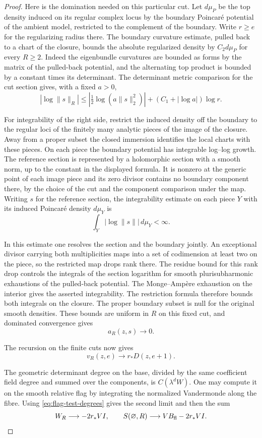 \begin{proof}
Here is the domination needed on this particular cut. Let
\(d\mu_P\) be the top density induced on its regular complex
locus by the boundary Poincar\'e potential of the ambient
model, restricted to the complement of the boundary. Write
\(r\ge e\) for the regularizing radius there. The
boundary curvature estimate, pulled back to a chart of the
closure, bounds the absolute regularized density by
\(C_2 d\mu_P\) for every \(R\ge2\). Indeed the eigenbundle
curvatures are bounded as forms by the matrix of the pulled-back
potential, and the alternating top product is bounded by a
constant times its determinant. The determinant metric comparison
for the cut section gives, with a fixed \(a>0\),
\[
 |\log\|s\|_R|
 \le |\tfrac12\log(a\|s\|_2^2)|
       +(C_1+|\log a|)\log r .
\]

For integrability of the right side, restrict the induced
density off the boundary to the regular loci of the finitely
many analytic pieces of the image of the closure. Away from
a proper subset the closed immersion identifies the local
charts with these pieces.
On each piece the boundary potential has integrable
log--log growth. The reference section is represented by a
holomorphic section with a smooth norm, up to the constant
in the displayed formula. It is nonzero at the generic point
of each image piece and its zero divisor contains no boundary
component there, by the choice of the cut and the
component comparison under the map. Writing \(s\) for the reference section, the integrability estimate on each piece \(Y\) with its induced Poincar\'e density \(d\mu_Y\) is
\[
 \int_Y\big|\log\|s\|\big|\,d\mu_Y<\infty.
\]

In this estimate one resolves the section
and the boundary jointly. An exceptional divisor carrying
both multiplicities maps into a set of codimension at least
two on the piece, so the restricted map drops rank there.
The residue bound for this rank drop controls the integrals
of the section logarithm for smooth plurisubharmonic
exhaustions of the pulled-back potential. The Monge--Ampère
exhaustion on the interior gives the asserted integrability.
The restriction formula therefore
bounds both integrals on the closure. The proper boundary
subset is null for the original smooth densities. These
bounds are uniform in \(R\) on this fixed cut, and dominated
convergence gives
\[
 a_R(z,s)\to0.
\]

\label{cor:covolume-flag-test-9}
The recursion on
the finite cuts now gives
\[
 v_R(z,e)\to r_*D(z,e+1).
\]


The geometric determinant degree on the base, divided by
the same coefficient field degree and summed over the
components, is \(C(\lambda^d W)\).
One may compute it on the smooth relative flag by
integrating the normalized Vandermonde along the fibre.
Using \eqref{eq:flag-test-degrees} gives the second
limit and then the sum
\begin{equation}\label{eq:flag-empty-limit}
 W_R\longrightarrow -2r_*VI,\qquad
 S(\varnothing,R)\longrightarrow VB_{\rm fl}-2r_*VI.
\end{equation}
\label{cor:covolume-flag-test-10}

\end{proof}

